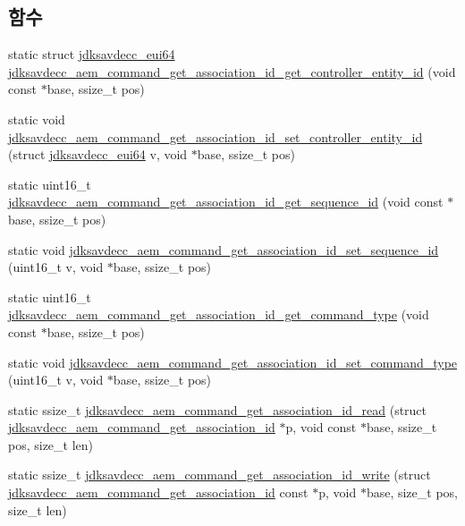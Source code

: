 \subsection*{함수}
\begin{DoxyCompactItemize}
\item 
static struct \hyperlink{structjdksavdecc__eui64}{jdksavdecc\+\_\+eui64} \hyperlink{group__command__get__association__id_ga46752c2a7645e56b9d720ae02ba70590}{jdksavdecc\+\_\+aem\+\_\+command\+\_\+get\+\_\+association\+\_\+id\+\_\+get\+\_\+controller\+\_\+entity\+\_\+id} (void const $\ast$base, ssize\+\_\+t pos)
\item 
static void \hyperlink{group__command__get__association__id_gaa30b532fe2b2f6ad7d018bd3dd54246d}{jdksavdecc\+\_\+aem\+\_\+command\+\_\+get\+\_\+association\+\_\+id\+\_\+set\+\_\+controller\+\_\+entity\+\_\+id} (struct \hyperlink{structjdksavdecc__eui64}{jdksavdecc\+\_\+eui64} v, void $\ast$base, ssize\+\_\+t pos)
\item 
static uint16\+\_\+t \hyperlink{group__command__get__association__id_gad67027ecbdffc86e43e24405c76834f1}{jdksavdecc\+\_\+aem\+\_\+command\+\_\+get\+\_\+association\+\_\+id\+\_\+get\+\_\+sequence\+\_\+id} (void const $\ast$base, ssize\+\_\+t pos)
\item 
static void \hyperlink{group__command__get__association__id_gabf6d63f7506403b286b4a6ff9839ac4d}{jdksavdecc\+\_\+aem\+\_\+command\+\_\+get\+\_\+association\+\_\+id\+\_\+set\+\_\+sequence\+\_\+id} (uint16\+\_\+t v, void $\ast$base, ssize\+\_\+t pos)
\item 
static uint16\+\_\+t \hyperlink{group__command__get__association__id_ga1f716b432b1c243da57c54ac8d45c059}{jdksavdecc\+\_\+aem\+\_\+command\+\_\+get\+\_\+association\+\_\+id\+\_\+get\+\_\+command\+\_\+type} (void const $\ast$base, ssize\+\_\+t pos)
\item 
static void \hyperlink{group__command__get__association__id_ga70cf1277a1a1ba0710b512841f629ca2}{jdksavdecc\+\_\+aem\+\_\+command\+\_\+get\+\_\+association\+\_\+id\+\_\+set\+\_\+command\+\_\+type} (uint16\+\_\+t v, void $\ast$base, ssize\+\_\+t pos)
\item 
static ssize\+\_\+t \hyperlink{group__command__get__association__id_ga956fff2d7ed648c8b20a5b3825335c3c}{jdksavdecc\+\_\+aem\+\_\+command\+\_\+get\+\_\+association\+\_\+id\+\_\+read} (struct \hyperlink{structjdksavdecc__aem__command__get__association__id}{jdksavdecc\+\_\+aem\+\_\+command\+\_\+get\+\_\+association\+\_\+id} $\ast$p, void const $\ast$base, ssize\+\_\+t pos, size\+\_\+t len)
\item 
static ssize\+\_\+t \hyperlink{group__command__get__association__id_gacb9188ac6069611481bc8074b63062b3}{jdksavdecc\+\_\+aem\+\_\+command\+\_\+get\+\_\+association\+\_\+id\+\_\+write} (struct \hyperlink{structjdksavdecc__aem__command__get__association__id}{jdksavdecc\+\_\+aem\+\_\+command\+\_\+get\+\_\+association\+\_\+id} const $\ast$p, void $\ast$base, size\+\_\+t pos, size\+\_\+t len)
\end{DoxyCompactItemize}


